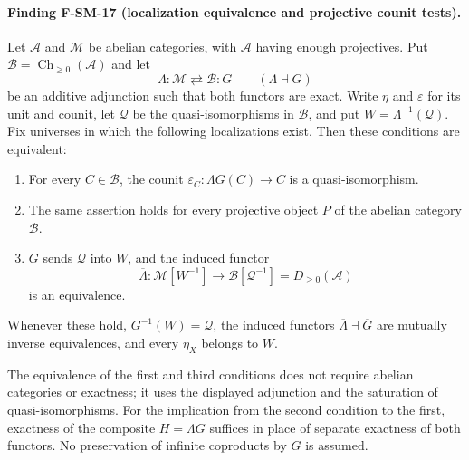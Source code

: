 \documentclass[11pt,a4paper]{article}
\theoremstyle{definition}\newtheorem{definition}[theorem]{Definition}
\theoremstyle{remark}\newtheorem{remark}[theorem]{Remark}
\begin{document}
\paragraph{Finding F-SM-17 (localization equivalence and projective counit tests).}
Let $\mathcal A$ and $\mathcal M$ be abelian categories, with
$\mathcal A$ having enough projectives.  Put
$\mathcal B=\operatorname{Ch}_{\geq0}(\mathcal A)$ and let
\[
 \Lambda:\mathcal M\rightleftarrows\mathcal B:G
 \qquad(\Lambda\dashv G)
\]
be an additive adjunction such that both functors are exact.  Write
$\eta$ and $\varepsilon$ for its unit and counit, let
$\mathcal Q$ be the quasi-isomorphisms in $\mathcal B$, and put
$W=\Lambda^{-1}(\mathcal Q)$.  Fix universes in which the following
localizations exist.  Then these conditions are equivalent:
\begin{enumerate}
\item For every $C\in\mathcal B$, the counit
      $\varepsilon_C:\Lambda G(C)\to C$ is a quasi-isomorphism.
\item The same assertion holds for every projective object $P$ of
      the abelian category $\mathcal B$.
\item $G$ sends $\mathcal Q$ into $W$, and the induced functor
      \[
       \overline\Lambda:\mathcal M[W^{-1}]
          \longrightarrow \mathcal B[\mathcal Q^{-1}]
          =D_{\geq0}(\mathcal A)
      \]
      is an equivalence.
\end{enumerate}
Whenever these hold, $G^{-1}(W)=\mathcal Q$, the induced functors
$\overline\Lambda\dashv\overline G$ are mutually inverse equivalences,
and every $\eta_X$ belongs to $W$.

The equivalence of the first and third conditions does not require
abelian categories or exactness; it uses the displayed adjunction and
the saturation of quasi-isomorphisms.  For the implication from the
second condition to the first, exactness of the composite
$H=\Lambda G$ suffices in place of separate exactness of both functors.
No preservation of infinite coproducts by $G$ is assumed.
\end{document}
